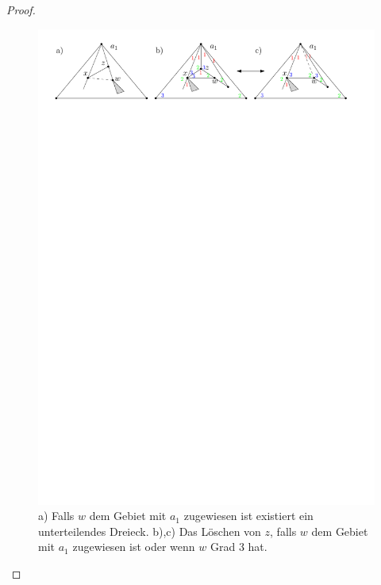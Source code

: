 \begin{proof}
\begin{description}[leftmargin =0pt, font = \bfseries]
\begin{figure}[h]
	\centering
	  \includegraphics[width=1\textwidth]{lem5_4.pdf}
\caption{a) Falls $w$ dem Gebiet mit $a_1$ zugewiesen ist existiert ein unterteilendes Dreieck. b),c) Das Löschen von $z$, falls $w$ dem Gebiet mit $a_1$ zugewiesen ist oder wenn $w$ Grad 3 hat. }
    	\label{pic_lem5_4}
\end{figure}


\end{description}
\end{proof}
